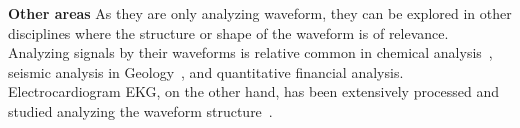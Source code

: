 \textbf{Other areas}
As they are only analyzing waveform, they can be explored in other disciplines where the structure or shape of the waveform is of relevance.  Analyzing signals by their waveforms is relative common in chemical analysis~\cite{Skoog2000}, seismic analysis in Geology~\cite{Owens1984}, and quantitative financial analysis.  Electrocardiogram EKG, on the other hand, has been extensively processed and studied analyzing the waveform structure~\cite{Stockman1976}.



%
